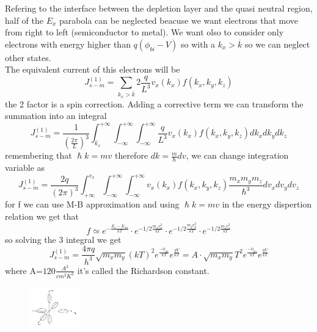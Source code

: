 Refering to the interface between the depletion layer and the quasi neutral region, half of the $E_x$ parabola can be neglected beacuse we want electrons that move from right to left (semiconductor to metal). We want olso to consider only electrons with energy higher than $q(\phi_{bi}-V)$ so with a $k_x>\overline{k}$ so we can neglect other states.\\
The equivalent current of this electrons will be 
\begin{equation}
J_{s-m}^{(1)}=\sum_{k_x>\overline{k}}2 \frac{q}{L^3}v_x(k_x)f(k_x,k_y,k_z)
\end{equation}
the 2 factor is a spin correction. Adding a corrective term we can transform the summation into an integral 
\begin{equation}
J_{s-m}^{(1)}=\frac{1}{(\frac{2\pi}{L})^3}\int_{\overline{k_x}}^{+\infty}\int_{-\infty}^{+\infty}\int_{-\infty}^{+\infty}\frac{q}{L^3}v_x(k_x)f(k_x,k_y,k_z)dk_xdk_ydk_z
\end{equation}
remembering that $\hslash k=mv$ therefore $dk=\frac{m}{\hslash}dv$, we can change integration variable as 
\begin{equation}
J_{s-m}^{(1)}=\frac{2q}{(2\pi)^3}\int_{+\infty}^{v_x}\int_{-\infty}^{+\infty}\int_{-\infty}^{+\infty}v_x(k_x)f(k_x,k_y,k_z) \frac{m_xm_ym_z}{\hslash^3} dv_xdv_ydv_z
\end{equation}
for f we can use M-B approximation and using $\hslash k=mv$ in the energy dispertion relation we get that
\begin{equation}
f\simeq e^{-\frac{E_c-E_{fn}}{kT}}\cdot e^{-1/2\frac{m_xv_x^2}{kT}}\cdot e^{-1/2\frac{m_yv_y^2}{kT}}\cdot e^{-1/2\frac{m_zv_z^2}{kT}}
\end{equation}
so solving the 3 integral we get 
\begin{equation}
J_{s-m}^{(1)}=\frac{4\pi q}{h^3}\sqrt{m_xm_y}(kT)^2e^{\frac{-\phi_{bn}}{kT}}e^{\frac{qV}{kT}}=A\cdot\sqrt{m_xm_y}T^2e^{\frac{-\phi_{bn}}{kT}}e^{\frac{qV}{kT}}
\end{equation}
where A=$120 \frac{A^2}{cm^2 K^2}$ it's called the Richardson constant.\\

\begin{figure}
\includegraphics[width=0.2\textwidth]{ellips.png}
\end{figure}

